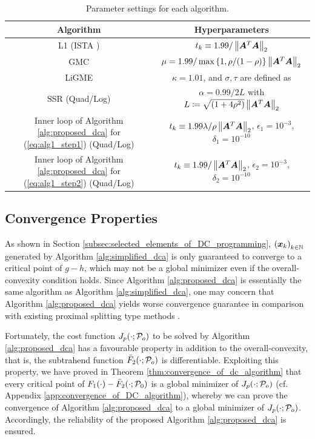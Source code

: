\documentclass[lettersize,journal]{IEEEtran}
\theoremstyle{plain}%
\theoremstyle{definition}
\theoremstyle{remark}
\begin{document}
\renewcommand{\arraystretch}{1.5}
\begin{table}
\centering
\caption{Parameter settings for each algorithm.}\label{table:algorithm_parameters}
\begin{tabular}{|c|c|} 
 \hline
 Algorithm & Hyperparameters \\
 \hline\hline
 L1 (ISTA \cite[Sec. 2.1]{beck2009}) & $t_k\equiv 1.99/\left\| \bm{A}^T\bm{A} \right\|_2$\\
 \hline
 GMC \cite[Prop. 15]{selesnick2017} & $\mu=1.99/\max\left\{ 1,\rho/(1-\rho) \right\}\left\| \bm{A}^T\bm{A} \right\|_2$\\
 \hline
 LiGME \cite[Alg. 1]{abe2020} &  $\kappa=1.01$, and $\sigma,\tau$ are defined as \cite[Footnote 7]{abe2020}\\
 \hline
 SSR \cite[Alg. 1]{alshabili2021} (Quad/Log) & $\alpha=0.99/2L$ with $L\coloneqq \sqrt{(1+4\rho^2)}\left\| \bm{A}^T\bm{A} \right\|_2$ \\
 \hline
 Inner loop of Algorithm \ref{alg:proposed_dca} for (\ref{eq:alg1_step1}) (Quad/Log) &  $t_k\equiv 1.99\lambda/\rho\left\| \bm{A}^T\bm{A} \right\|_2$, $\epsilon_1=10^{-3}$, $\delta_1=10^{-10}$\\
 \hline
 Inner loop of Algorithm \ref{alg:proposed_dca} for (\ref{eq:alg1_step2}) (Quad/Log) & $t_k\equiv 1.99/\left\| \bm{A}^T\bm{A} \right\|_2$, $\epsilon_2=10^{-3}$, $\delta_2=10^{-10}$\\
 \hline
\end{tabular}
\end{table}

\subsection{Convergence Properties}
As shown in Section \ref{subsec:selected_elements_of_DC_programming}, $\left( \bm{x}_k \right )_{k\in\mathbb{N}}$ generated by Algorithm \ref{alg:simplified_dca} is only guaranteed to converge to a critical point of $g-h$, which may not be a global minimizer even if the overall-convexity condition holds. Since Algorithm \ref{alg:proposed_dca} is essentially the same algorithm as Algorithm \ref{alg:simplified_dca}, one may concern that Algorithm \ref{alg:proposed_dca} yields worse convergence guarantee in comparison with existing proximal splitting type methods \cite{selesnick2017,abe2020,alshabili2021,yata2021}. 

Fortunately, the cost function $J_{p}(\cdot;\mathcal{P}_o)$ to be solved by Algorithm \ref{alg:proposed_dca} has a favourable property in addition to the overall-convexity, that is, the subtrahend function $\bar{F}_2(\cdot;\mathcal{P}_o)$ is differentiable. Exploiting this property, we have proved in Theorem \ref{thm:convergence_of_dc_algorithm} that every critical point of $F_1(\cdot)-\bar{F}_2(\cdot;\mathcal{P}_0)$ is a global minimizer of $J_{p}(\cdot;\mathcal{P}_o)$ (cf. Appendix \ref{app:convergence_of_DC_algorithm}), whereby we can prove the convergence of Algorithm \ref{alg:proposed_dca} to a global minimizer of $J_{p}(\cdot;\mathcal{P}_o)$. Accordingly, the reliability of the proposed Algorithm \ref{alg:proposed_dca} is ensured.
\end{document}
